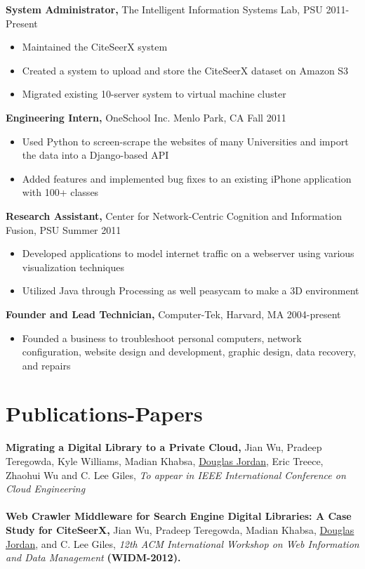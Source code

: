 \documentclass[margin]{res}
\begin{document}
\begin{resume}
{\bf System Administrator,} The Intelligent Information Systems Lab, PSU \hfill 2011-Present
\begin{itemize} \itemsep -2pt  %
\item Maintained the CiteSeerX system 
\item Created a system to upload and store the CiteSeerX dataset on Amazon S3
\item Migrated existing 10-server system to virtual machine cluster 
\end{itemize}
 
{\bf Engineering Intern,} OneSchool Inc. Menlo Park, CA \hfill Fall 2011
\begin{itemize} \itemsep -2pt %
\item Used Python to screen-scrape the websites of many Universities and import the data into a Django-based API
\item Added features and implemented bug fixes to an existing iPhone application with 100+ classes
\end{itemize}

{\bf Research Assistant,} Center for Network-Centric Cognition and Information Fusion, PSU \hfill Summer 2011
\begin{itemize} \itemsep -2pt
\item Developed applications to model internet traffic on a webserver using various visualization techniques 
\item Utilized Java through Processing as well peasycam to make a 3D environment
\end{itemize}

{\bf Founder and Lead Technician,} Computer-Tek, Harvard, MA \hfill 2004-present
\begin{itemize} \itemsep -2pt
\item Founded a business to troubleshoot personal computers, network configuration, website design and development, graphic design, data recovery, and repairs
\end{itemize}

\section{Publications-Papers}
{\bf Migrating a Digital Library to a Private Cloud,} Jian Wu, Pradeep Teregowda, Kyle Williams, Madian Khabsa, \underline{Douglas Jordan}, Eric Treece, Zhaohui Wu and C. Lee Giles, \textit{To appear in IEEE International Conference on Cloud Engineering}\\ \\
{\bf Web Crawler Middleware for Search Engine Digital Libraries: A Case Study for CiteSeerX,} Jian Wu, Pradeep Teregowda, Madian Khabsa, \underline{Douglas Jordan}, and C. Lee Giles, \emph{12th ACM International Workshop on Web Information and Data Management} {\bf (WIDM-2012).}


\end{resume}
\end{document}
